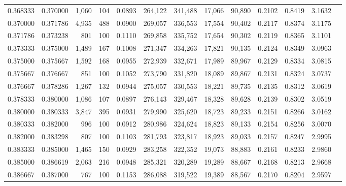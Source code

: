 \begin{tabular}{rrrrrrrrrrrrr}
0.368333 & 0.370000 & 1,060 & 104 &                                     0.0893 & 264,122 & 341,488 &  17,066 &  90,890 & 0.2102 & 0.8419 & 3.1632 \\
0.370000 & 0.371786 & 4,935 & 488 &                                     0.0900 & 269,057 & 336,553 &  17,554 &  90,402 & 0.2117 & 0.8374 & 3.1175 \\
0.371786 & 0.373238 &   801 & 100 &                                     0.1110 & 269,858 & 335,752 &  17,654 &  90,302 & 0.2119 & 0.8365 & 3.1101 \\
0.373333 & 0.375000 & 1,489 & 167 &                                     0.1008 & 271,347 & 334,263 &  17,821 &  90,135 & 0.2124 & 0.8349 & 3.0963 \\
0.375000 & 0.375667 & 1,592 & 168 &                                     0.0955 & 272,939 & 332,671 &  17,989 &  89,967 & 0.2129 & 0.8334 & 3.0815 \\
0.375667 & 0.376667 &   851 & 100 &                                     0.1052 & 273,790 & 331,820 &  18,089 &  89,867 & 0.2131 & 0.8324 & 3.0737 \\
0.376667 & 0.378286 & 1,267 & 132 &                                     0.0944 & 275,057 & 330,553 &  18,221 &  89,735 & 0.2135 & 0.8312 & 3.0619 \\
0.378333 & 0.380000 & 1,086 & 107 &                                     0.0897 & 276,143 & 329,467 &  18,328 &  89,628 & 0.2139 & 0.8302 & 3.0519 \\
0.380000 & 0.380333 & 3,847 & 395 &                                     0.0931 & 279,990 & 325,620 &  18,723 &  89,233 & 0.2151 & 0.8266 & 3.0162 \\
0.380333 & 0.382000 &   996 & 100 &                                     0.0912 & 280,986 & 324,624 &  18,823 &  89,133 & 0.2154 & 0.8256 & 3.0070 \\
0.382000 & 0.383298 &   807 & 100 &                                     0.1103 & 281,793 & 323,817 &  18,923 &  89,033 & 0.2157 & 0.8247 & 2.9995 \\
0.383333 & 0.385000 & 1,465 & 150 &                                     0.0929 & 283,258 & 322,352 &  19,073 &  88,883 & 0.2161 & 0.8233 & 2.9860 \\
0.385000 & 0.386619 & 2,063 & 216 &                                     0.0948 & 285,321 & 320,289 &  19,289 &  88,667 & 0.2168 & 0.8213 & 2.9668 \\
0.386667 & 0.387000 &   767 & 100 &                                     0.1153 & 286,088 & 319,522 &  19,389 &  88,567 & 0.2170 & 0.8204 & 2.9597 \\

\end{tabular}
